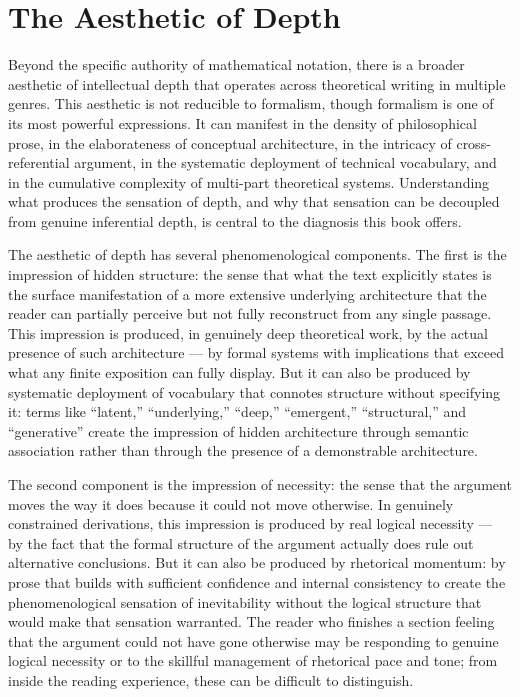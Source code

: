 \documentclass[12pt, openright, twoside]{book}
\begin{document}
\section{The Aesthetic of Depth}

Beyond the specific authority of mathematical notation, there is a broader
aesthetic of intellectual depth that operates across theoretical writing
in multiple genres. This aesthetic is not reducible to formalism, though
formalism is one of its most powerful expressions. It can manifest in
the density of philosophical prose, in the elaborateness of conceptual
architecture, in the intricacy of cross-referential argument, in the
systematic deployment of technical vocabulary, and in the cumulative
complexity of multi-part theoretical systems. Understanding what produces
the sensation of depth, and why that sensation can be decoupled from
genuine inferential depth, is central to the diagnosis this book offers.

The aesthetic of depth has several phenomenological components. The
first is the impression of hidden structure: the sense that what the
text explicitly states is the surface manifestation of a more extensive
underlying architecture that the reader can partially perceive but not
fully reconstruct from any single passage. This impression is produced,
in genuinely deep theoretical work, by the actual presence of such
architecture --- by formal systems with implications that exceed what
any finite exposition can fully display. But it can also be produced
by systematic deployment of vocabulary that connotes structure without
specifying it: terms like ``latent,'' ``underlying,'' ``deep,'' ``emergent,''
``structural,'' and ``generative'' create the impression of hidden architecture
through semantic association rather than through the presence of a
demonstrable architecture.

The second component is the impression of necessity: the sense that
the argument moves the way it does because it could not move otherwise.
In genuinely constrained derivations, this impression is produced by
real logical necessity --- by the fact that the formal structure of the
argument actually does rule out alternative conclusions. But it can also
be produced by rhetorical momentum: by prose that builds with sufficient
confidence and internal consistency to create the phenomenological
sensation of inevitability without the logical structure that would
make that sensation warranted. The reader who finishes a section feeling
that the argument could not have gone otherwise may be responding to
genuine logical necessity or to the skillful management of rhetorical
pace and tone; from inside the reading experience, these can be difficult
to distinguish.
\end{document}
